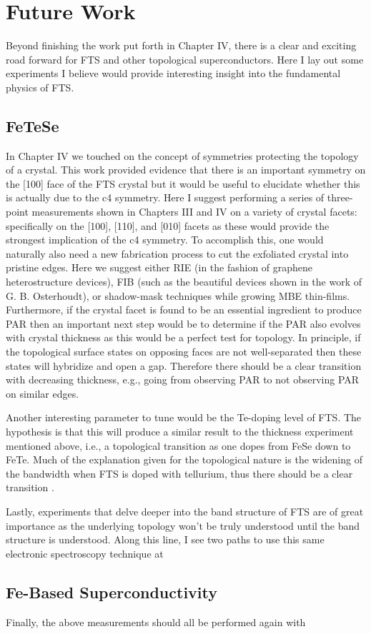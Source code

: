 \section{Future Work}
Beyond finishing the work put forth in Chapter IV, there is a clear and exciting road forward for \ac{FTS} and other topological superconductors. Here I lay out some experiments I believe would provide interesting insight into the fundamental physics of \ac{FTS}.
\subsection{FeTeSe}
In Chapter IV we touched on the concept of symmetries protecting the topology of a crystal. This work provided evidence that there is an important symmetry on the [100] face of the \ac{FTS} crystal but it would be useful to elucidate whether this is actually due to the c4 symmetry. Here I suggest performing a series of three-point measurements shown in Chapters III and IV on a variety of crystal facets: specifically on the [100], [110], and [010] facets as these would provide the strongest implication of the c4 symmetry. To accomplish this, one would naturally also need a new fabrication process to cut the exfoliated crystal into pristine edges. Here we suggest either RIE (in the fashion of graphene heterostructure devices), FIB (such as the beautiful devices shown in the work of G. B. Osterhoudt\cite{Osterhoudt2019}), or shadow-mask techniques while growing MBE thin-films. Furthermore, if the crystal facet is found to be an essential ingredient to produce \ac{PAR} then an important next step would be to determine if the \ac{PAR} also evolves with crystal thickness as this would be a perfect test for topology. In principle, if the topological surface states on opposing faces are not well-separated then these states will hybridize and open a gap. Therefore there should be a clear transition with decreasing thickness, e.g., going from observing \ac{PAR} to not observing \ac{PAR} on similar edges.\par 
Another interesting parameter to tune would be the Te-doping level of \ac{FTS}. The hypothesis is that this will produce a similar result to the thickness experiment mentioned above, i.e., a topological transition as one dopes from FeSe down to FeTe. Much of the explanation given for the topological nature is the widening of the bandwidth when FTS is doped with tellurium, thus there should be a clear transition .\par 
Lastly, experiments that delve deeper into the band structure of \ac{FTS} are of great importance as the underlying topology won't be truly understood until the band structure is understood. Along this line, I see two paths to use this same electronic spectroscopy technique at 
\subsection{Fe-Based Superconductivity}
Finally, the above measurements should all be performed again with 